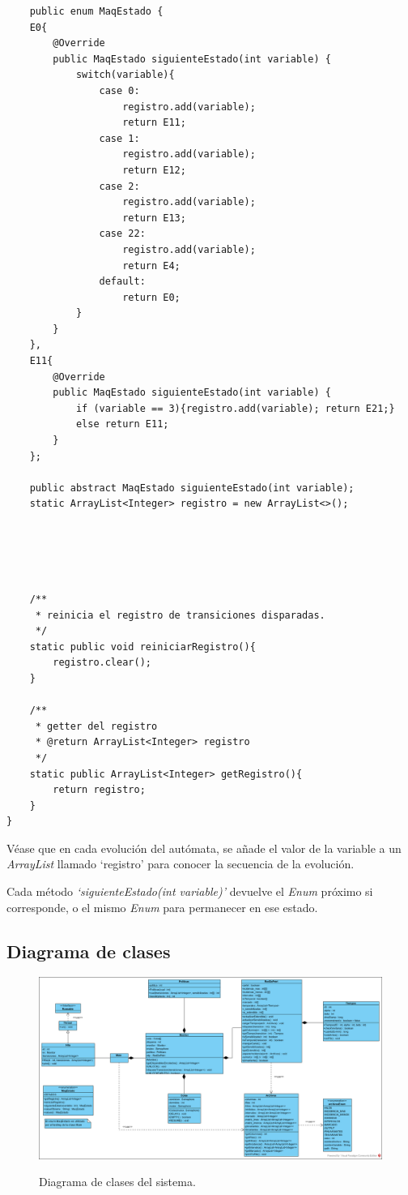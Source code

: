 \documentclass[12pt,a4paper]{article}
\begin{document}
\begin{lstlisting}
    public enum MaqEstado {
    E0{
        @Override
        public MaqEstado siguienteEstado(int variable) {
            switch(variable){
                case 0:
                    registro.add(variable);
                    return E11;
                case 1:
                    registro.add(variable);
                    return E12;
                case 2:
                    registro.add(variable);
                    return E13;
                case 22:
                    registro.add(variable);
                    return E4;
                default:
                    return E0;
            }
        }
    },
    E11{
        @Override
        public MaqEstado siguienteEstado(int variable) {
            if (variable == 3){registro.add(variable); return E21;}
            else return E11;
        }
    };
    
    public abstract MaqEstado siguienteEstado(int variable);
    static ArrayList<Integer> registro = new ArrayList<>();
    
    
    
    
    
    /**
     * reinicia el registro de transiciones disparadas.
     */
    static public void reiniciarRegistro(){
        registro.clear();
    }
    
    /**
     * getter del registro
     * @return ArrayList<Integer> registro
     */
    static public ArrayList<Integer> getRegistro(){
        return registro;
    }
}
\end{lstlisting}
Véase que en cada evolución del autómata, se añade el valor de la variable a un \textit{ArrayList} llamado `registro' para conocer la secuencia de la evolución.

Cada método \textit{`siguienteEstado(int variable)'} devuelve el \textit{Enum} próximo si corresponde, o el mismo \textit{Enum} para permanecer en ese estado.

\newpage
\subsection{Diagrama de clases}
\begin{figure}[H]
    \centering
    \includegraphics[width=15.5cm]{DClases.png}
    \label{fig:dclases}
    \caption{Diagrama de clases del sistema.}
\end{figure}
\end{document}
